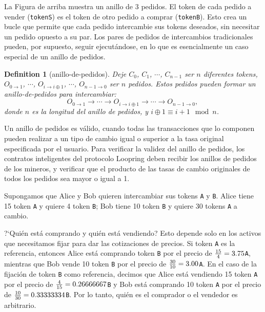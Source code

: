 \documentclass[UTF8,nofonts]{article}
\newtheorem{definition}{Definition}[section]
\begin{document}
\begin{multicols}{2}
La Figura de arriba muestra un anillo de 3 pedidos. El token de cada pedido a vender (\verb|tokenS|) es el token de otro pedido a comprar (\verb|tokenB|). Esto crea un bucle que permite que cada pedido intercambie sus tokens deseados, sin necesitar un pedido opuesto a su par. Los pares de pedidos de intercambios tradicionales pueden, por supuesto, seguir ejecut\'andose, en lo que es esencialmente un caso especial de un anillo de pedidos.


\begin{definition}[anillo-de-pedidos] Deje $C_{0}$, $C_{1}$, $\cdots$, $C_{n-1}$ ser $n$ diferentes tokens, $O_{0\rightarrow 1}$, $\cdots$, $O_{i\rightarrow i\oplus 1}$, $\cdots$, $O_{n-1 \rightarrow 0}$ ser $n$ pedidos. Estos pedidos pueden formar un anillo-de-pedidos para intercambiar:
$$O_{0\rightarrow 1} \rightarrow \cdots \rightarrow O_{i\rightarrow i\oplus 1} \rightarrow \cdots \rightarrow O_{n-1\rightarrow 0} \text{, }$$
donde $n$ es la longitud del anillo de pedidos, y $i\oplus 1 \equiv i+1 \mod n$.
\end{definition}

Un anillo de pedidos es v\'alido, cuando todas las transacciones que lo componen pueden realizar a un tipo de cambio igual o superior a la tasa original especificada por el usuario. Para verificar la validez del anillo de pedidos, los contratos inteligentes del protocolo Loopring deben recibir los anillos de pedidos de los mineros, y verificar que el producto de las tasas de cambio originales de todos los pedidos sea mayor o igual a 1.

Supongamos que Alice y Bob quieren intercambiar sus tokens \verb|A| y \verb|B|. Alice tiene 15 token \verb|A| y quiere 4 token \verb|B|; Bob tiene 10 token \verb|B| y quiere 30 tokens \verb|A| a cambio.



?`Qui\'en est\'a comprando y qui\'en est\'a vendiendo? Esto depende solo en los activos que necesitamos fijar para dar las cotizaciones de precios. Si token \verb|A| es la referencia, entonces Alice est\'a comprando token \verb|B| por el precio de ${15 \over 4} = 3.75$\verb|A|, mientras que Bob vende 10 token \verb|B| por el precio de ${30 \over 10} = 3.00$\verb|A|. En el caso de la fijaci\'on de token \verb|B| como referencia, decimos que Alice est\'a vendiendo 15 token \verb|A| por el precio de ${4 \over 15} = 0.26666667$\verb|B| y Bob est\'a comprando 10 token \verb|A| por el precio de ${10 \over 30} = 0.33333334 $\verb|B|. Por lo tanto, qui\'en es el comprador o el vendedor es arbitrario.



\end{multicols}
\end{document}
